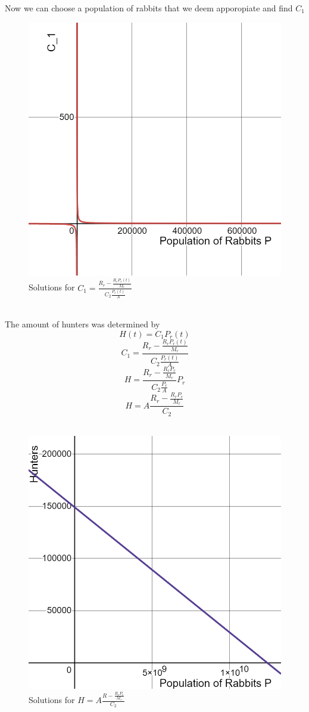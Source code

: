 \documentclass{article}
\begin{document}
Now we can choose a population of rabbits that we deem apporopiate and find $C_1$
\begin{figure}[h!]
	\centering
	\includegraphics[scale=0.3]{Pictures/C_1-P}
	\caption{Solutions for $C_1 = \frac{R_r-\frac{R_rP_r(t)}{M_r}}{C_2 \frac{P_r(t)}{A}} $ }
	\label{fig:C_1-P}
\end{figure}
\\
The amount of hunters was determined by 
$$H(t) = C_1 P_r(t)$$
$$ C_1 = \frac{R_r-\frac{R_rP_r(t)}{M_r}}{C_2 \frac{P_r(t)}{A}} $$
$$H=\frac{R_r-\frac{R_rP_r}{M_r}}{C_2 \frac{P_r}{A}}P_r$$
$$H = A\frac{R_r-\frac{R_rP_r}{M_r}}{C_2}$$
\\
\begin{figure}[h!]
	\centering
	\includegraphics[scale=0.3]{Pictures/H-P}
	\caption{Solutions for $H = A\frac{R-\frac{R_rP_r}{M_r}}{C_2}$ }
	\label{fig:H-P}
\end{figure}
\end{document}
